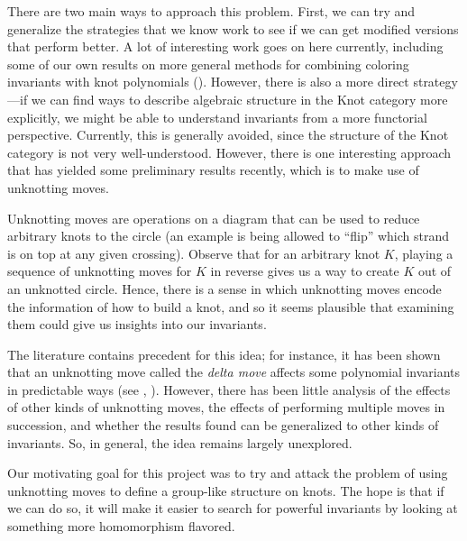 There are two main ways to approach this problem. First, we can try
and generalize the strategies that we know work to see if we can get
modified versions that perform better. A lot of interesting work goes
on here currently, including some of our own results on more general
methods for combining coloring invariants with knot polynomials
(\cite{Kobayashi2019Sep}). However, there is also a more direct
strategy---if we can find ways to describe algebraic structure in the
Knot category more explicitly, we might be able to understand
invariants from a more functorial perspective. Currently, this is
generally avoided, since the structure of the Knot category is not
very well-understood. However, there is one interesting approach that
has yielded some preliminary results recently, which is to make use of
unknotting moves.

Unknotting moves are operations on a diagram that can be used to
reduce arbitrary knots to the circle (an example is being allowed to
``flip'' which strand is on top at any given crossing). Observe that
for an arbitrary knot $K$, playing a sequence of unknotting moves for
$K$ in reverse gives us a way to create $K$ out of an unknotted
circle. Hence, there is a sense in which unknotting moves encode the
information of how to build a knot, and so it seems plausible that
examining them could give us insights into our invariants.

The literature contains precedent for this idea; for instance, it has
been shown that an unknotting move called the \emph{delta move}
affects some polynomial invariants in predictable ways (see
\cite{Kanenobu2005Jan}, \cite{Ganzell2014Feb}). However, there has
been little analysis of the effects of other kinds of unknotting
moves, the effects of performing multiple moves in succession, and
whether the results found can be generalized to other kinds of
invariants. So, in general, the idea remains largely unexplored.

Our motivating goal for this project was to try and attack the problem
of using unknotting moves to define a group-like structure on knots.
The hope is that if we can do so, it will make it easier to search for
powerful invariants by looking at something more homomorphism
flavored.








